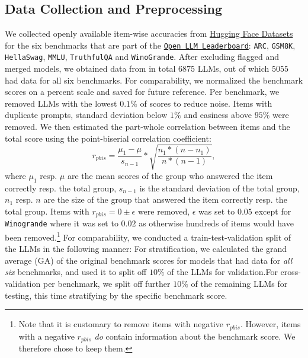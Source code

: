 \documentclass{article}
\begin{document}
\subsection{Data Collection and Preprocessing}
We collected openly available item-wise accuracies from \href{https://huggingface.co/datasets}{Hugging Face Datasets} for the six benchmarks that are part of the \href{https://huggingface.co/open-llm-leaderboard}{\texttt{Open LLM Leaderboard}}: \texttt{ARC}, \texttt{GSM8K}, \texttt{HellaSwag}, \texttt{MMLU}, \texttt{TruthfulQA} and \texttt{WinoGrande}. %
After excluding flagged and merged models, we obtained data from in total $6875$ LLMs, out of which $5055$ had data for all six benchmarks. For comparability, we normalized the benchmark scores on a percent scale and saved for future reference. Per benchmark, we removed LLMs with the lowest $0.1\%$ of scores to reduce noise.
Items with duplicate prompts, standard deviation below $1\%$ and easiness above $95\%$ were removed. We then estimated the part-whole correlation between  items and the total score using the point-biserial correlation coefficient:
\begin{equation}
   r_{pbis} = \frac{\mu_1 - \mu}{s_{n-1}} * \sqrt{\frac{n_1 * (n-n_1)}{n*(n-1)}},
\end{equation}
where $\mu_1$ resp. $\mu$ are the mean scores of the group who answered the item correctly resp. the total group, $s_{n-1}$ is the standard deviation of the total group, $n_1$ resp. $n$ are the size of the group that answered the item correctly resp. the total group. Items with $r_{pbis} = 0 \pm \epsilon$ were removed, $\epsilon$ was set to $0.05$ except for \texttt{Winogrande} where it was set to $0.02$ as otherwise hundreds of items would have been removed.\footnote{Note that it is customary to remove items with negative $r_{pbis}$. However, items with a negative $r_{pbis}$ \textit{do} contain information about the benchmark score. We therefore chose to keep them.}
For comparability, we conducted a train-test-validation split of the LLMs in the following manner: For stratification, we calculated the grand average (GA) of the original benchmark scores for models that had data for \textit{all six} benchmarks, and used it to split off $10\%$ of the LLMs for validation.For cross-validation per benchmark, we split off further $10\%$ of the remaining LLMs for testing, this time stratifying by the specific benchmark score. 
\end{document}
